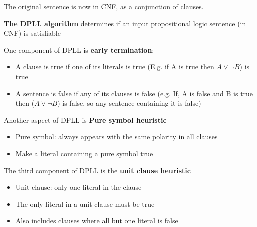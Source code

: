 \documentclass{article}
\begin{document}
The original sentence is now in CNF, as a conjunction of clauses. 

\textbf{The DPLL algorithm} determines if an input propositional logic sentence (in CNF) is satisfiable

One component of DPLL is \textbf{early termination}:
\begin{itemize}
    \item A clause is true if one of its literals is true (E.g. if A is true then $A \vee \neg B$) is true
    \item A sentence is false if any of its clauses is false (e.g. If, A is false and B is true then ($A \vee \neg B$) is false, so any sentence containing it is false)
\end{itemize}

Another aspect of DPLL is \textbf{Pure symbol heuristic}
\begin{itemize}
    \item Pure symbol: always appears with the same polarity in all clauses
    \item Make a literal containing a pure symbol true
\end{itemize}

The third component of DPLL is the \textbf{unit clause heuristic}
\begin{itemize}
    \item Unit clause: only one literal in the clause
    \item The only literal in a unit clause must be true
    \item Also includes clauses where all but one literal is false
\end{itemize}
\end{document}
